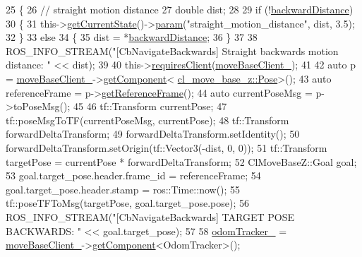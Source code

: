 \begin{DoxyCode}
25     \{
26         \textcolor{comment}{// straight motion distance}
27         \textcolor{keywordtype}{double} dist;
28 
29         \textcolor{keywordflow}{if} (!\hyperlink{classcl__move__base__z_1_1CbNavigateBackwards_abb7099e4e18602f6cf06c4f5534a2a15}{backwardDistance})
30         \{
31             this->\hyperlink{classsmacc_1_1ISmaccClientBehavior_a34fde34e48fa13db622ee60d8374d0b8}{getCurrentState}()->\hyperlink{classsmacc_1_1ISmaccState_a4f2ff8e3eda8aa9bbb60c8ff17d0def1}{param}(\textcolor{stringliteral}{"straight\_motion\_distance"}, dist, 3.5);
32         \}
33         \textcolor{keywordflow}{else}
34         \{
35             dist = *\hyperlink{classcl__move__base__z_1_1CbNavigateBackwards_abb7099e4e18602f6cf06c4f5534a2a15}{backwardDistance};
36         \}
37 
38         ROS\_INFO\_STREAM(\textcolor{stringliteral}{"[CbNavigateBackwards] Straight backwards motion distance: "} << dist);
39 
40         this->\hyperlink{classsmacc_1_1ISmaccClientBehavior_a32b16e99e3b4cb289414203dc861a440}{requiresClient}(\hyperlink{classcl__move__base__z_1_1CbNavigateBackwards_a943c1a790eac9266adf11fbdc078f03a}{moveBaseClient\_});
41 
42         \textcolor{keyword}{auto} p = \hyperlink{classcl__move__base__z_1_1CbNavigateBackwards_a943c1a790eac9266adf11fbdc078f03a}{moveBaseClient\_}->\hyperlink{classsmacc_1_1ISmaccClient_adef78db601749ca63c19e74a27cb88cc}{getComponent}<
      \hyperlink{classcl__move__base__z_1_1Pose}{cl\_move\_base\_z::Pose}>();
43         \textcolor{keyword}{auto} referenceFrame = p->\hyperlink{classcl__move__base__z_1_1Pose_af8c2dc151e74aa8da6b283d1c8563051}{getReferenceFrame}();
44         \textcolor{keyword}{auto} currentPoseMsg = p->toPoseMsg();
45 
46         tf::Transform currentPose;
47         tf::poseMsgToTF(currentPoseMsg, currentPose);
48         tf::Transform forwardDeltaTransform;
49         forwardDeltaTransform.setIdentity();
50         forwardDeltaTransform.setOrigin(tf::Vector3(-dist, 0, 0));
51         tf::Transform targetPose = currentPose * forwardDeltaTransform;
52         ClMoveBaseZ::Goal goal;
53         goal.target\_pose.header.frame\_id = referenceFrame;
54         goal.target\_pose.header.stamp = ros::Time::now();
55         tf::poseTFToMsg(targetPose, goal.target\_pose.pose);
56         ROS\_INFO\_STREAM(\textcolor{stringliteral}{"[CbNavigateBackwards] TARGET POSE BACKWARDS: "} << goal.target\_pose);
57 
58         \hyperlink{classcl__move__base__z_1_1CbNavigateBackwards_a75a8ae7aef6c72e96f4037c4941b0341}{odomTracker\_} = \hyperlink{classcl__move__base__z_1_1CbNavigateBackwards_a943c1a790eac9266adf11fbdc078f03a}{moveBaseClient\_}->\hyperlink{classsmacc_1_1ISmaccClient_adef78db601749ca63c19e74a27cb88cc}{getComponent}<OdomTracker>();

\end{DoxyCode}
